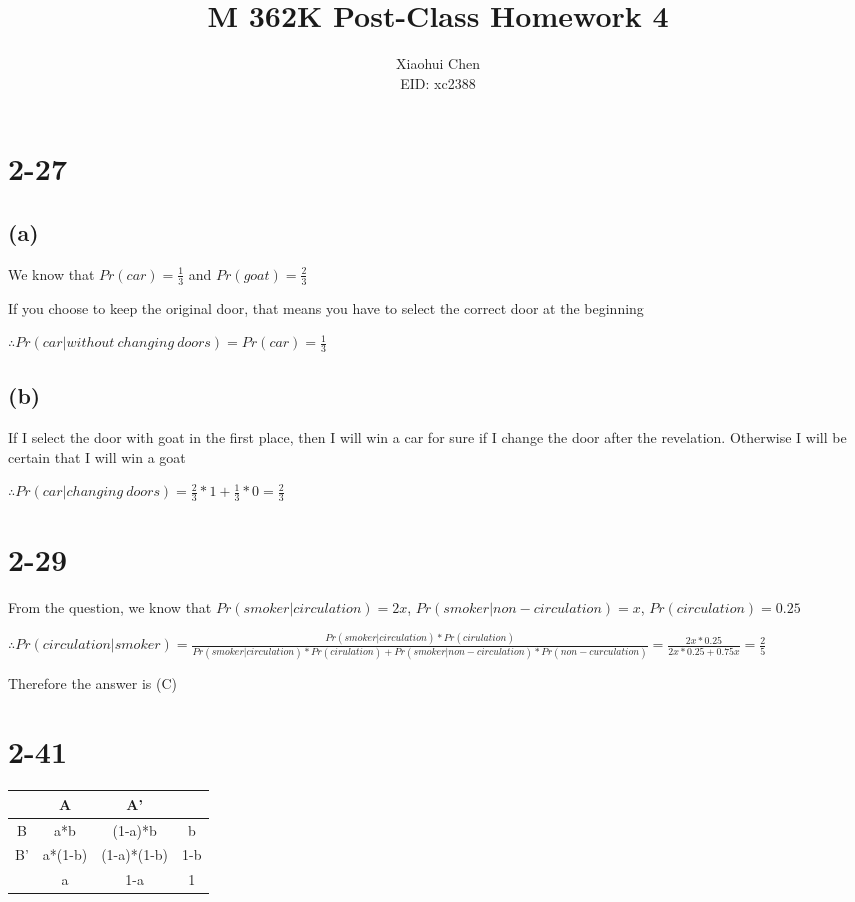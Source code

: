 \documentclass[12pt]{article}
\author{Xiaohui Chen \\EID: xc2388}
\title{M 362K Post-Class Homework 4}
\begin{document}
\maketitle
\begin{spacing}{2.0}

\section*{2-27}

\subsection*{(a)}
We know that $Pr(car)=\frac{1}{3}$ and $Pr(goat)=\frac{2}{3}$

If you choose to keep the original door, that means you have to select the correct door at the beginning

$\therefore Pr(car|without\ changing\ doors)=Pr(car)= \frac{1}{3}$

\subsection*{(b)}

If I select the door with goat in the first place, then I will win a car for sure if I change the door after the revelation. Otherwise I will be certain that I will win a goat

$\therefore Pr(car|changing\ doors)=\frac{2}{3}*1+ \frac{1}{3}*0=\frac{2}{3}$

\section*{2-29}
From the question, we know that $Pr(smoker|circulation)= 2x$, $Pr(smoker|non-circulation)=x$, $Pr(circulation)=0.25$

$\therefore Pr(circulation|smoker)= \frac{Pr(smoker|circulation) * Pr(cirulation)}{Pr(smoker|circulation) * Pr(cirulation) + Pr(smoker|non-circulation)*Pr(non-curculation)}= \frac{2x*0.25}{2x*0.25+0.75x}=\frac{2}{5}$

Therefore the answer is (C)

\section*{2-41}
\begin{tabular}{|c|c|c|c|}
  \hline
    & A & A' &   \\
  \hline
  B & a*b & (1-a)*b & b \\
  \hline
  B' & a*(1-b) & (1-a)*(1-b) & 1-b \\
  \hline
    & a & 1-a &  1 \\
  \hline
\end{tabular}


\end{spacing}
\end{document}
